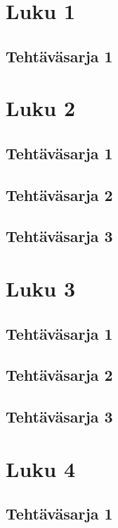 %
%
%
%
%
%
%

\chapter{Luku 1}
	\section{Tehtäväsarja 1}
		
\chapter{Luku 2}
	\section{Tehtäväsarja 1}
		
	\section{Tehtäväsarja 2}
		
	\section{Tehtäväsarja 3}
		
\chapter{Luku 3}
	\section{Tehtäväsarja 1}
		
	\section{Tehtäväsarja 2}
		
	\section{Tehtäväsarja 3}
		
\chapter{Luku 4}
	\section{Tehtäväsarja 1}
		
